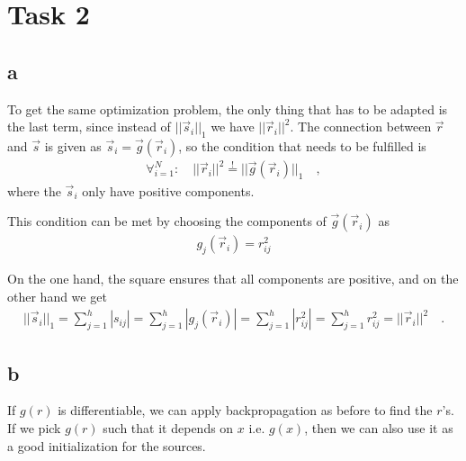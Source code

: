 \section*{Task 2}

\subsection*{a}

To get the same optimization problem, the only thing that has to be adapted is the last term, since instead of $||\vec s_i||_1$ we have $||\vec r_i||^2$.
The connection between $\vec r$ and $\vec s$ is given as $\vec s_i = \vec g(\vec r_i)$, so the condition that needs to be fulfilled is
\begin{align*}
\forall^N_{i=1}: \quad ||\vec r_i||^2 \overset{!}{=} ||\vec g(\vec r_i)||_1 \quad ,
\end{align*}
where the $\vec s_i$ only have positive components.

This condition can be met by choosing the components of $\vec{g}(\vec{r}_i)$ as
\begin{align*}
g_j(\vec{r}_i) = r_{ij}^2
\end{align*}

On the one hand, the square ensures that all components are positive, and on the other hand we get
\begin{align*}
||\vec s_i||_1 = \sum^h_{j=1} |s_{ij}| = \sum^h_{j=1} |g_j(\vec{r}_i)|
= \sum^h_{j=1} |r_{ij}^2| = \sum^h_{j=1} r_{ij}^2 = ||\vec r_i||^2 \quad .
\end{align*}

\subsection*{b}

If $g(r)$ is differentiable, we can apply backpropagation as before to find the
$r$'s. If we pick $g(r)$ such that it depends on $x$ i.e. $g(x)$, then  we can also use it as
a good initialization for the sources.